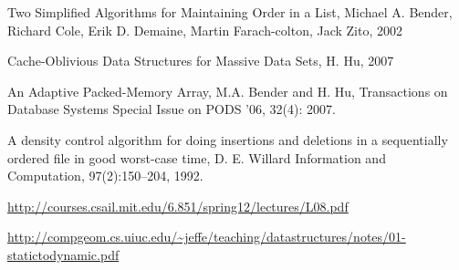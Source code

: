 \documentclass[10pt]{article}
\begin{document}
\begin{thebibliography}{}

  Two Simplified Algorithms for Maintaining Order in a List, 
  Michael A. Bender, Richard Cole, Erik D. Demaine, Martin Farach-colton, Jack Zito, 
  2002

  Cache-Oblivious Data Structures for Massive Data Sets,
  H. Hu,
  2007

  An Adaptive Packed-Memory Array,
  M.A. Bender and H. Hu, 
  Transactions on Database Systems Special Issue on PODS '06, 32(4): 2007.

  A density control algorithm for doing insertions and deletions in a sequentially ordered file in good worst-case time, 
  D. E. Willard
  Information and Computation, 97(2):150–204, 1992.

  \url{http://courses.csail.mit.edu/6.851/spring12/lectures/L08.pdf}

  \url{http://compgeom.cs.uiuc.edu/~jeffe/teaching/datastructures/notes/01-statictodynamic.pdf}

\end{thebibliography}
\end{document}
